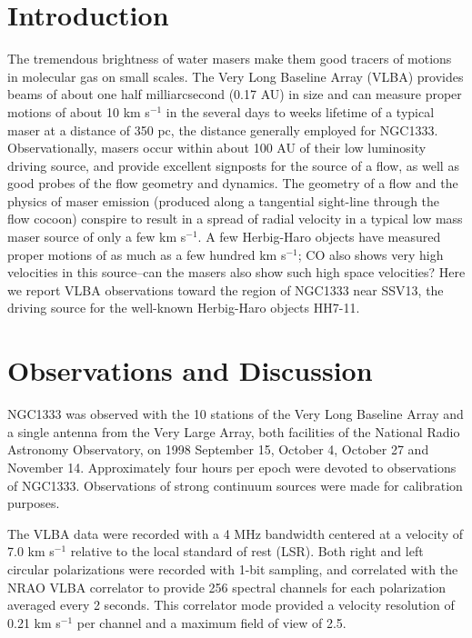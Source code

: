\section{Introduction}
The tremendous brightness of water masers make them good tracers of motions in molecular gas on small scales.  The Very Long Baseline Array  (VLBA) provides beams of about one half milliarcsecond (0.17 AU) in size and can measure proper motions of about 10 km s$^{-1}$ in the several days to weeks lifetime of a typical maser at a distance of 350 pc, the distance generally employed for NGC1333.   Observationally, masers occur within about 100 AU of their low luminosity driving source, and provide excellent signposts for the source of a flow, as well as good probes of the flow geometry and dynamics. The geometry of a flow and the physics of maser emission (produced along a tangential sight-line through the flow cocoon) conspire to result in a spread of radial velocity in a typical low mass maser source of only a few  km s$^{-1}$.  A few Herbig-Haro objects have measured proper motions of as much as a few hundred  km s$^{-1}$; CO also shows very high velocities in this source--can the masers also show such high space velocities?  Here we report VLBA observations toward the region of NGC1333 near SSV13, the driving source for the well-known Herbig-Haro objects HH7-11.

\section{Observations and Discussion}

NGC1333 was observed with the 10 stations of the Very Long Baseline Array and a single antenna from the Very Large Array, both facilities of the National Radio Astronomy Observatory, on 1998 September 15, October 4, October 27 and November 14. Approximately four hours per epoch were devoted to observations of NGC1333.  Observations of strong continuum sources were made for calibration purposes.

The VLBA data were recorded with a 4 MHz bandwidth centered at a velocity of 7.0 km s$^{-1}$ relative to the local standard of rest (LSR).  Both right and left circular polarizations were recorded with 1-bit sampling, and correlated with the NRAO VLBA correlator to provide 256 spectral channels for each polarization averaged every 2 seconds.  This correlator mode provided a velocity resolution of 0.21 km s$^{-1}$ per channel and a maximum field of  view of 2.5\arcsec. 

